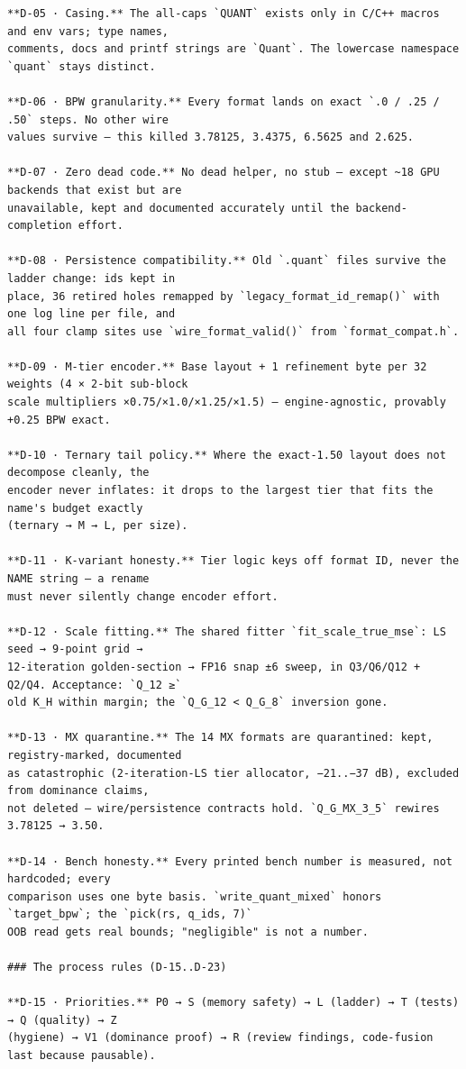 \begin{Verbatim}[breaklines,breakanywhere,fontsize=\footnotesize]
**D-05 · Casing.** The all-caps `QUANT` exists only in C/C++ macros and env vars; type names,
comments, docs and printf strings are `Quant`. The lowercase namespace `quant` stays distinct.

**D-06 · BPW granularity.** Every format lands on exact `.0 / .25 / .50` steps. No other wire
values survive — this killed 3.78125, 3.4375, 6.5625 and 2.625.

**D-07 · Zero dead code.** No dead helper, no stub — except ~18 GPU backends that exist but are
unavailable, kept and documented accurately until the backend-completion effort.

**D-08 · Persistence compatibility.** Old `.quant` files survive the ladder change: ids kept in
place, 36 retired holes remapped by `legacy_format_id_remap()` with one log line per file, and
all four clamp sites use `wire_format_valid()` from `format_compat.h`.

**D-09 · M-tier encoder.** Base layout + 1 refinement byte per 32 weights (4 × 2-bit sub-block
scale multipliers ×0.75/×1.0/×1.25/×1.5) — engine-agnostic, provably +0.25 BPW exact.

**D-10 · Ternary tail policy.** Where the exact-1.50 layout does not decompose cleanly, the
encoder never inflates: it drops to the largest tier that fits the name's budget exactly
(ternary → M → L, per size).

**D-11 · K-variant honesty.** Tier logic keys off format ID, never the NAME string — a rename
must never silently change encoder effort.

**D-12 · Scale fitting.** The shared fitter `fit_scale_true_mse`: LS seed → 9-point grid →
12-iteration golden-section → FP16 snap ±6 sweep, in Q3/Q6/Q12 + Q2/Q4. Acceptance: `Q_12 ≥`
old K_H within margin; the `Q_G_12 < Q_G_8` inversion gone.

**D-13 · MX quarantine.** The 14 MX formats are quarantined: kept, registry-marked, documented
as catastrophic (2-iteration-LS tier allocator, −21..−37 dB), excluded from dominance claims,
not deleted — wire/persistence contracts hold. `Q_G_MX_3_5` rewires 3.78125 → 3.50.

**D-14 · Bench honesty.** Every printed bench number is measured, not hardcoded; every
comparison uses one byte basis. `write_quant_mixed` honors `target_bpw`; the `pick(rs, q_ids, 7)`
OOB read gets real bounds; "negligible" is not a number.

### The process rules (D-15..D-23)

**D-15 · Priorities.** P0 → S (memory safety) → L (ladder) → T (tests) → Q (quality) → Z
(hygiene) → V1 (dominance proof) → R (review findings, code-fusion last because pausable).


\end{Verbatim}
